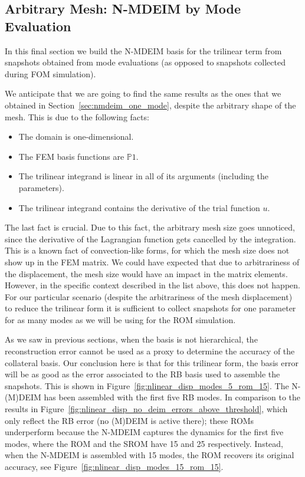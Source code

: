 \documentclass[../../thesis.tex]{subfiles}
\begin{document}
\clearpage
\subsection{Arbitrary Mesh: N-MDEIM by Mode Evaluation}
\label{sec:arbitrary_mesh_nmdeim_mode_evaluation}
In this final section we build the N-MDEIM basis for the trilinear term
from snapshots obtained from mode evaluations 
(as opposed to snapshots collected during FOM simulation).

We anticipate that we are going to find the same results as the ones that we obtained in
Section~\ref{sec:nmdeim_one_mode}, despite the arbitrary shape of the mesh.
This is due to the following facts:
\begin{itemize}
    \item The domain is one-dimensional.
    \item The FEM basis functions are $\mathbb{P}1$.
    \item The trilinear integrand is linear in all of its arguments (including the parameters).
    \item The trilinear integrand contains the derivative of the trial function $u$.
\end{itemize}
The last fact is crucial. 
Due to this fact, the arbitrary mesh size goes unnoticed, 
since the derivative of the Lagrangian function gets cancelled by the integration.
This is a known fact of convection-like forms, 
for which the mesh size does not show up in the FEM matrix.
We could have expected that due to arbitrariness of the displacement,
the mesh size would have an impact in the matrix elements.
However, in the specific context described in the list above,
this does not happen.
For our particular scenario (despite the arbitrariness of the mesh displacement)
to reduce the trilinear form it is sufficient to collect snapshots for one parameter
for as many modes as we will be using for the ROM simulation. 

As we saw in previous sections, when the basis is not hierarchical, 
the reconstruction error cannot be used as a proxy to determine the accuracy of the collateral basis.
Our conclusion here is that for this trilinear form, 
the basis error will be as good as the error associated to the RB basis used to assemble the snapshots.
This is shown in Figure~\ref{fig:nlinear_disp_modes_5_rom_15}.
The N-(M)DEIM has been assembled with the first five RB modes.
In comparison to the results in Figure~\ref{fig:nlinear_disp_no_deim_errors_above_threshold},
which only reflect the RB error (no (M)DEIM is active there);
these ROMs underperform because the N-MDEIM captures the dynamics for the first five modes,
where the ROM and the SROM have 15 and 25 respectively.
Instead, when the N-MDEIM is assembled with 15 modes, the ROM recovers its original accuracy,
see Figure~\ref{fig:nlinear_disp_modes_15_rom_15}.
\end{document}
